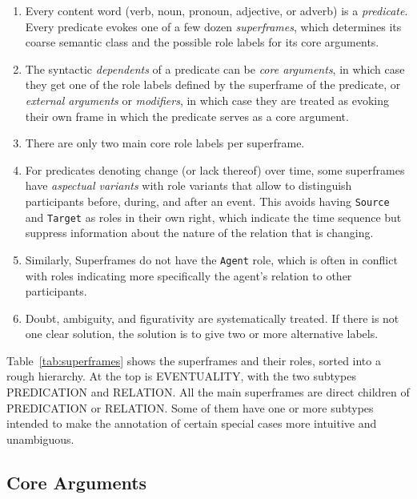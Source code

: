 \documentclass[a4paper]{article}
\newcommand{\fr}[1]{\textsf{#1}}
\begin{document}
\begin{enumerate}
    \item Every content word (verb, noun, pronoun, adjective, or adverb) is a
        \emph{predicate}. Every predicate evokes one of a few dozen
        \emph{superframes}, which determines its coarse semantic class and the
        possible role labels for its core arguments.
    \item The syntactic \emph{dependents} of a predicate can be
        \emph{core arguments}, in which case they get one of the role labels
        defined by the superframe of the predicate, or \emph{external
        arguments} or \emph{modifiers}, in which case they are treated as
        evoking their own frame in which the predicate serves as a core argument.
    \item There are only two main core role labels per superframe.
    \item For predicates denoting change (or lack thereof) over time,
        some superframes have \emph{aspectual variants} with role variants that
        allow to distinguish participants before, during, and after an event.
        This avoids having \texttt{Source} and \texttt{Target} as roles in
        their own right, which indicate the time sequence but suppress
        information about the nature of the relation that is changing.
    \item Similarly, Superframes do not have the \texttt{Agent} role, which is
        often in conflict with roles indicating more specifically the agent's
        relation to other participants.
    \item Doubt, ambiguity, and figurativity are systematically treated. If there
        is not one clear solution, the solution is to give two or more
        alternative labels.
\end{enumerate}

Table~\ref{tab:superframes} shows the superframes and their roles, sorted into
a rough hierarchy. At the top is \fr{EVENTUALITY}, with the two subtypes
\fr{PREDICATION} and \fr{RELATION}. All the main superframes are direct
children of \fr{PREDICATION} or \fr{RELATION}. Some of them have one or more
subtypes intended to make the annotation of certain special cases more
intuitive and unambiguous.

\newpage\subsection{Core Arguments}
\end{document}
